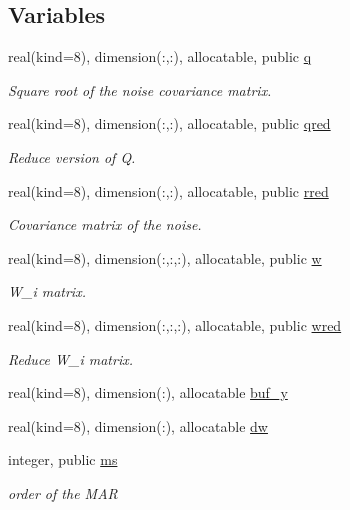 \subsection*{Variables}
\begin{DoxyCompactItemize}
\item 
real(kind=8), dimension(\+:,\+:), allocatable, public \hyperlink{namespacemar_a92dfc55f0e9c6d1fc05f03f30df2e526}{q}
\begin{DoxyCompactList}\small\item\em Square root of the noise covariance matrix. \end{DoxyCompactList}\item 
real(kind=8), dimension(\+:,\+:), allocatable, public \hyperlink{namespacemar_a0fa33035c3ff86abcb91dfaf29dd90d4}{qred}
\begin{DoxyCompactList}\small\item\em Reduce version of Q. \end{DoxyCompactList}\item 
real(kind=8), dimension(\+:,\+:), allocatable, public \hyperlink{namespacemar_a315f9c1483809c1c037c88242c5d85e7}{rred}
\begin{DoxyCompactList}\small\item\em Covariance matrix of the noise. \end{DoxyCompactList}\item 
real(kind=8), dimension(\+:,\+:,\+:), allocatable, public \hyperlink{namespacemar_aed76f863f30ab18ba428596d2157163d}{w}
\begin{DoxyCompactList}\small\item\em W\+\_\+i matrix. \end{DoxyCompactList}\item 
real(kind=8), dimension(\+:,\+:,\+:), allocatable, public \hyperlink{namespacemar_af8cb3185ff947cb6540a6b33838e23d7}{wred}
\begin{DoxyCompactList}\small\item\em Reduce W\+\_\+i matrix. \end{DoxyCompactList}\item 
real(kind=8), dimension(\+:), allocatable \hyperlink{namespacemar_a91d79995717316d4fcea39b2e476324c}{buf\+\_\+y}
\item 
real(kind=8), dimension(\+:), allocatable \hyperlink{namespacemar_a5fbf8b9142fbfce9bdd17cb573a448c3}{dw}
\item 
integer, public \hyperlink{namespacemar_a12c0dbfaa748dffd1cd2f96b19b53102}{ms}
\begin{DoxyCompactList}\small\item\em order of the M\+AR \end{DoxyCompactList}\end{DoxyCompactItemize}



